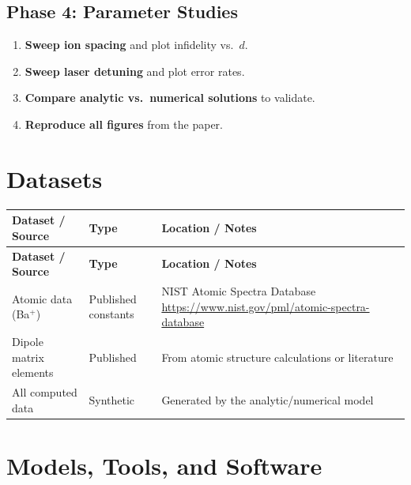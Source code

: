 \documentclass[11pt,a4paper]{article}
\begin{document}
\subsection{Phase 4: Parameter Studies}
\begin{enumerate}[label=\textbf{4.\arabic*}]
  \item \textbf{Sweep ion spacing} and plot infidelity vs.\ $d$.
  \item \textbf{Sweep laser detuning} and plot error rates.
  \item \textbf{Compare analytic vs.\ numerical solutions} to validate.
  \item \textbf{Reproduce all figures} from the paper.
\end{enumerate}

\section{Datasets}

\begin{longtable}{p{4.5cm} p{3.5cm} p{6cm}}
\toprule
\textbf{Dataset / Source} & \textbf{Type} & \textbf{Location / Notes} \\
\midrule
\endfirsthead
\toprule
\textbf{Dataset / Source} & \textbf{Type} & \textbf{Location / Notes} \\
\midrule
\endhead
Atomic data (Ba$^+$) & Published constants & NIST Atomic Spectra Database \newline \url{https://www.nist.gov/pml/atomic-spectra-database} \\
\midrule
Dipole matrix elements & Published & From atomic structure calculations or literature \\
\midrule
All computed data & Synthetic & Generated by the analytic/numerical model \\
\bottomrule
\end{longtable}

\section{Models, Tools, and Software}
\end{document}
